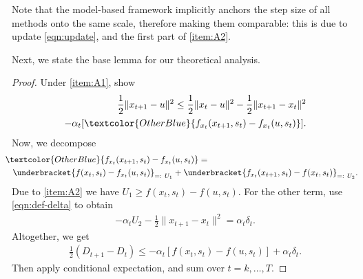 \documentclass{article}
\newcommand{\R}{\mathbb{R}}
\newcommand{\N}{\mathbb{N}}
\newcommand{\E}{\mathbb{E}}
\theoremstyle{plain}
\newtheorem{lemma}[theorem]{Lemma}
\theoremstyle{definition}
\theoremstyle{remark}
\begin{document}
Note that the model-based framework implicitly anchors the step size of all methods onto the same scale, therefore making them comparable: this is due to update \eqref{eqn:update}, and the first part of \ref{item:A2}.


Next, we state the base lemma for our theoretical analysis.
%
\begin{proof}
    Under \ref{item:A1}, \citet[Lem.\ 3.7]{Asi2019} show
    \begin{align*}
        \frac12 \|x_{t+1} - u\|^2 \leq \frac12 \|x_t-u\|^2   -
        \frac12 \|x_{t+1}-x_t\|^2 \\
        - \alpha_t[\textcolor{OtherBlue}{f_{x_t}(x_{t+1},s_t) - f_{x_t}(u,s_t)}].
    \end{align*}
    Now, we decompose
    \begin{align*}
        &\hspace{-2ex} \textcolor{OtherBlue}{f_{x_t}(x_{t+1},s_t) - f_{x_t}(u,s_t)} =  \\
        &\underbracket{f(x_t,s_t) - f_{x_t}(u,s_t)}_{=:~U_1} + \underbracket{f_{x_t}(x_{t+1},s_t) - f(x_t,s_t)}_{=:~U_2}.
    \end{align*}
    Due to \ref{item:A2} we have $U_1 \geq f(x_t,s_t) - f(u,s_t)$.
    For the other term, use \eqref{eqn:def-delta} to obtain
    \begin{align*}
        -\alpha_t U_2 - \frac12\|x_{t+1}-x_t\|^2 = \alpha_t \delta_t. 
    \end{align*}
    Altogether, we get
    \begin{align}\label{eqn:single-step-base-ineq}
        \frac12 (D_{t+1}-D_t) \leq - \alpha_t[f(x_{t},s_t) - f(u,s_t)] + \alpha_t \delta_t.
    \end{align}
    Then apply conditional expectation, and sum over $t=k,\ldots,T$.
\end{proof}
\end{document}
